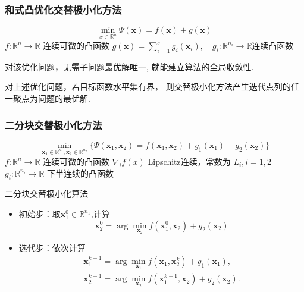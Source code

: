 \subsubsection{和式凸优化交替极小化方法}
\[
    \min_{x\in\mathbb{R}^n}\Psi(\boldsymbol{x})=f(\boldsymbol{x})+g(\boldsymbol{x})
\]
$f:\mathbb{R}^n\to\mathbb{R}$ 连续可微的凸函数
\newline
$g(\boldsymbol{x})=\sum_{i=1}^{s}g_{i}(\boldsymbol{x}_{i}),\quad g_{i}:\mathbb{R}^{n_{i}}\to\mathbb{R}$连续凸函数

对该优化问题，无需子问题最优解唯一, 就能建立算法的全局收敛性. 
\begin{theorem}
    对上述优化问题，若目标函数水平集有界， 则交替极小化方法产生迭代点列的任一聚点为问题的最优解.
\end{theorem}
\subsubsection{二分块交替极小化方法}
\[
    \min_{\boldsymbol{x}_1\in\mathbb{R}^{n_1},\boldsymbol{x}_2\in\mathbb{R}^{n_2}}\{\Psi(\boldsymbol{x}_1,\boldsymbol{x}_2)=f(\boldsymbol{x}_1,\boldsymbol{x}_2)+g_1(\boldsymbol{x}_1)+g_2(\boldsymbol{x}_2)\}
\]
$f:\mathbb{R}^n\to\mathbb{R}$ 连续可微的凸函数
\newline
$\nabla_if(x)$ Lipschitz连续，常数为 $L_i,i=1,2$ 
\newline
$g_i:\mathbb{R}^{n_i}\to\mathbb{R}$ 下半连续的凸函数

\begin{note}
    二分块交替极小化算法
    \begin{itemize}
        \item 初始步：取$\boldsymbol{x}_1^0\in\mathbb{R}^{n_1}$,计算
        \[
            \boldsymbol{x}_2^0=\arg\min_{\boldsymbol{x}_2}f(\boldsymbol{x}_1^0,\boldsymbol{x}_2)+g_2(\boldsymbol{x}_2)    
        \]
        \item 选代步：依次计算
        \[
            \begin{array}{l}
                \boldsymbol{x}_{1}^{k+1}=\arg\min_{\boldsymbol{x}_{1}}f(\boldsymbol{x}_{1},\boldsymbol{x}_{2}^{k})+g_{1}(\boldsymbol{x}_{1}),\\
                \boldsymbol{x}_{2}^{k+1}=\arg\min_{\boldsymbol{x}_{2}}f(\boldsymbol{x}_{1}^{k+1},\boldsymbol{x}_{2})+g_{2}(\boldsymbol{x}_{2}).
            \end{array}
        \]
    \end{itemize}
\end{note}
   
